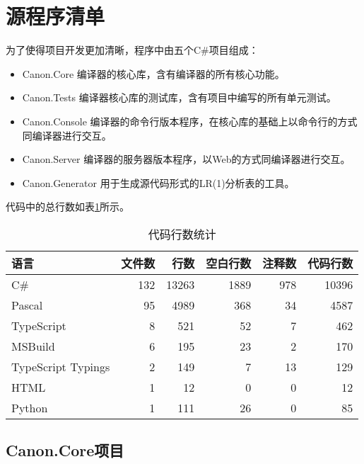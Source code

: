 \documentclass[../main.tex]{subfiles}
\begin{document}
\section{源程序清单}

为了使得项目开发更加清晰，程序中由五个C\#项目组成：
\begin{itemize}
    \item Canon.Core 编译器的核心库，含有编译器的所有核心功能。
    \item Canon.Tests 编译器核心库的测试库，含有项目中编写的所有单元测试。
    \item Canon.Console 编译器的命令行版本程序，在核心库的基础上以命令行的方式同编译器进行交互。
    \item Canon.Server 编译器的服务器版本程序，以Web的方式同编译器进行交互。
    \item Canon.Generator 用于生成源代码形式的LR(1)分析表的工具。
\end{itemize}

代码中的总行数如表\ref{tab:code_lines}所示。

\begin{table}[htbp]
    \centering
    \begin{tabular}{|l|r|r|r|r|r|}
        \hline
        语言 & 文件数 & 行数 & 空白行数 & 注释数 & 代码行数 \\
        \hline
        C\# & 132 & 13263 & 1889  &    978 &  10396   \\
        Pascal & 95 & 4989 & 368 & 34 &   4587  \\
        TypeScript & 8   &   521   &   52   &     7   &  462 \\
        MSBuild &  6    &  195   &   23   &     2   &  170 \\
        TypeScript Typings &  2 & 149  &   7  &  13  & 129 \\
        HTML  & 1     &  12   &    0    &    0     & 12 \\
        Python & 1 & 111 & 26 &  0 & 85 \\
        \hline
    \end{tabular}
    \caption{代码行数统计}
    \label{tab:code_lines}
\end{table}

\subsection{Canon.Core项目}
\end{document}

